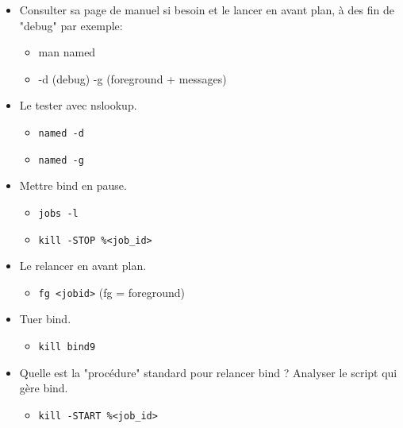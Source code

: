 \documentclass[a4paper]{article}
\begin{document}
\begin{itemize}
\item Consulter sa page de manuel si besoin et le lancer en avant plan, à des fin de "debug" par exemple:
\begin{itemize}
    \item man named
    \item -d (debug) -g (foreground + messages)
\end{itemize}

\item Le tester avec nslookup.
\begin{example}
    \begin{itemize}
        \item \texttt{named -d}
        \item \texttt{named -g}
    \end{itemize}
\end{example}

\item Mettre bind en pause.
\begin{example}
    \begin{itemize}
        \item \texttt{jobs -l}
        \item \texttt{kill -STOP \%<job\_id>}
    \end{itemize}
\end{example}

\item Le relancer en avant plan.
\begin{example}
    \begin{itemize}
        \item \texttt{fg <jobid>} (fg = foreground)
    \end{itemize}
\end{example}

\item Tuer bind.
\begin{example}
    \begin{itemize}
        \item \texttt{kill bind9}
    \end{itemize}
\end{example}

\item Quelle est la "procédure" standard pour relancer bind ? Analyser le script qui gère bind.
\begin{example}
    \begin{itemize}
        \item \texttt{kill -START \%<job\_id>}
    \end{itemize}
\end{example}


\end{itemize}
\end{document}
